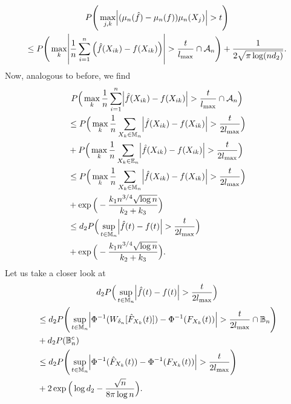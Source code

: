 \begin{multline*}
    P\Bigg(\max_{j,k}\abs{(\mu_n(\hat{f}) - \mu_n(f))\mu_n(X_j)} > t \Bigg) \\
    \leq P\Bigg(\max_{k}\abs{ \frac{1}{n}\sum_{i=1}^n \left(\hat{f}(X_{ik}) - f(X_{ik})\right)} > \frac{t}{l_{\max}} \cap \mathcal{A}_n \Bigg) + \frac{1}{2\sqrt{\pi \log(nd_2)}}.
\end{multline*}
Now, analogous to before, we find
\begin{multline}\label{eq::std}
    P\Big(\max_k \frac{1}{n} \sum_{i=1}^n \abs{\hat{f}(X_{ik}) - f(X_{ik})} > \frac{t}{l_{\max}} \cap \mathcal{A}_n \Big) \\
    \begin{aligned}
         & \leq P\Big(\max_k \frac{1}{n} \sum_{X_{k} \in \mathbb{M}_n} \abs{\hat{f}(X_{ik}) - f(X_{ik})} > \frac{t}{2l_{\max}}\Big)  \\
         & + P\Big(\max_k \frac{1}{n} \sum_{X_{k} \in \mathbb{E}_n} \abs{\hat{f}(X_{ik}) - f(X_{ik})} > \frac{t}{2l_{\max}}\Big)     \\
         & \leq P\Big(\max_k \frac{1}{n} \sum_{X_{k} \in \mathbb{M}_n} \abs{\hat{f}(X_{ik}) - f(X_{ik})} > \frac{t}{2l_{\max}} \Big) \\
         & + \exp\Big(- \frac{k_1 n^{3/4} \sqrt{\log n}}{k_2+ k_3} \Big)                                                             \\
         & \leq d_2P\Big(\sup_{t \in \mathbb{M}_n} \abs{\hat{f}(t) - f(t)} > \frac{t}{2l_{\max}} \Big)                               \\
         & + \exp\Big(- \frac{k_1 n^{3/4} \sqrt{\log n}}{k_2+ k_3} \Big).
    \end{aligned}
\end{multline}
Let us take a closer look at
\begin{multline*}
    d_2P\Big(\sup_{t \in \mathbb{M}_n} \abs{\hat{f}(t) - f(t)} > \frac{t}{2l_{\max}} \Big) \\
    \begin{aligned}
         & \leq d_2P\Bigg(\sup_{t \in \mathbb{M}_n} \abs{\Phi^{-1}(W_{\delta_n}[\hat{F}_{X_k}(t)]) - \Phi^{-1}(F_{X_k}(t))} > \frac{t}{2l_{\max}} \cap \mathbb{B}_n\Bigg) \\
         & + d_2P(\mathbb{B}_n^c)                                                                                                                                         \\
         & \leq d_2P\Bigg(\sup_{t \in \mathbb{M}_n} \abs{\Phi^{-1}(\hat{F}_{X_k}(t)) - \Phi^{-1}(F_{X_k}(t))} > \frac{t}{2l_{\max}} \Bigg)                                \\
         & + 2\exp\Big(\log d_2 - \frac{\sqrt{n}}{8\pi\log n}\Big).
    \end{aligned}
\end{multline*}
